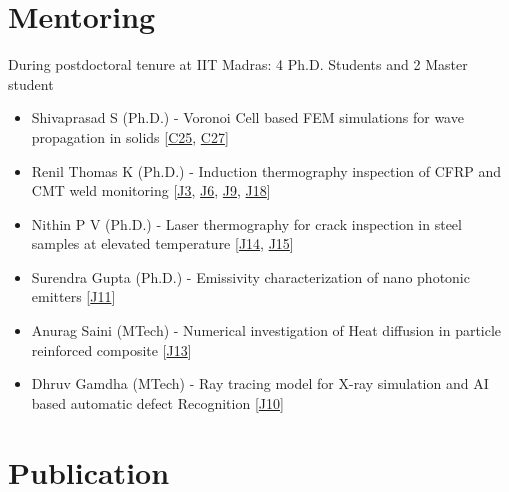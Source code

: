 \documentclass{my_cv}%
\begin{document}
\section{Mentoring}
\vspace{0.3em}
\noindent \faEye \hspace{1em} \color{mygray} During postdoctoral tenure at IIT Madras: 4 Ph.D. Students and 2 Master student 
\begin{itemize}[leftmargin=0.15in]
\setlength\itemsep{-0.15em}
\color{mygray}
\item Shivaprasad S (Ph.D.) - Voronoi Cell based FEM simulations for wave propagation in solids [\textcolor{mypink}{\hyperref[C25]{C25}}, \textcolor{mypink}{\hyperref[C27]{C27}}]
\item Renil Thomas K (Ph.D.) - Induction thermography inspection of CFRP and CMT weld monitoring [\textcolor{mypink}{\hyperref[J3]{J3}}, \textcolor{mypink}{\hyperref[J6]{J6}}, \textcolor{mypink}{\hyperref[J9]{J9}}, \textcolor{mypink}{\hyperref[J18]{J18}}] 
\item Nithin P V (Ph.D.) - Laser thermography for crack inspection in steel samples at elevated temperature [\textcolor{mypink}{\hyperref[J14]{J14}}, \textcolor{mypink}{\hyperref[J15]{J15}}]
\item Surendra Gupta (Ph.D.) - Emissivity characterization of nano photonic emitters [\textcolor{mypink}{\hyperref[J11]{J11}}]
\item Anurag Saini (MTech) - Numerical investigation of Heat diffusion in particle reinforced composite [\textcolor{mypink}{\hyperref[J13]{J13}}]
\item Dhruv Gamdha (MTech) - Ray tracing model for X-ray simulation and AI based automatic defect Recognition [\textcolor{mypink}{\hyperref[J10]{J10}}]
\end{itemize}
\section{Publication}
\vspace{0.5em}

\end{document}
